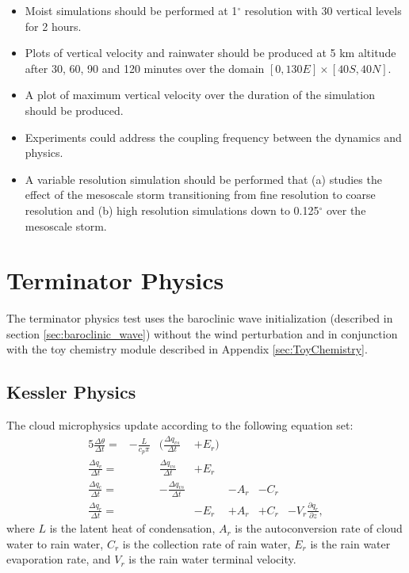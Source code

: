 \documentclass[times,doublespace]{fldauth}
\newcommand{\pdiff}[2]{\frac{\partial #1}{\partial #2}}
\begin{document}
{\begin{itemize}
\item Moist simulations should be performed at 1$^\circ$ resolution with 30 vertical levels for 2 hours.
\item Plots of vertical velocity and rainwater should be produced at 5 km altitude after 30, 60, 90 and 120 minutes over the domain $[0, 130E] \times [40S, 40N]$.
\item A plot of maximum vertical velocity over the duration of the simulation should be produced.
\item Experiments could address the coupling frequency between the dynamics and physics.
\item A variable resolution simulation should be performed that (a) studies the effect of the mesoscale storm transitioning from fine resolution to coarse resolution and (b) high resolution simulations down to 0.125$^\circ$ over the mesoscale storm.
\end{itemize}


\clearpage
\section{Terminator Physics}

The terminator physics test uses the baroclinic wave initialization (described in section \ref{sec:baroclinic_wave}) without the wind perturbation and in conjunction with the toy chemistry module described in Appendix \ref{sec:ToyChemistry}.





\begin{appendix}


\section{Kessler Physics} \label{sec:KesslerPhysics}

The cloud microphysics update according to the following equation set:
\begin{alignat}{5}
\frac{\Delta \theta}{\Delta t} = & - \frac{L}{c_p \pi} & \Big( \frac{\Delta q_{vs}}{\Delta t} & + E_r  \Big) & \\
\frac{\Delta q_v}{\Delta t} = & & \frac{\Delta q_{vs}}{\Delta t} & + E_r \\
\frac{\Delta q_c}{\Delta t} = & & - \frac{\Delta q_{vs}}{\Delta t} & & - A_r & - C_r \\
\frac{\Delta q_r}{\Delta t} = & & & - E_r & + A_r & + C_r & - V_r \pdiff{q_r}{z},
\end{alignat} where $L$ is the latent heat of condensation, $A_r$ is the autoconversion rate of cloud water to rain water, $C_r$ is the collection rate of rain water, $E_r$ is the rain water evaporation rate, and $V_r$ is the rain water terminal velocity.


\end{appendix}}
\end{document}
